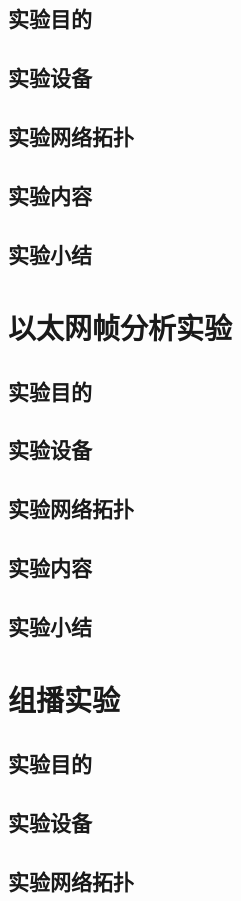 \documentclass[lang=cn,11pt,a4paper,cite=authoryear]{elegantpaper}
\begin{document}
\subsection{实验目的}
\subsection{实验设备}
\subsection{实验网络拓扑}
\subsection{实验内容}
\subsection{实验小结}
\section{以太网帧分析实验}
\subsection{实验目的}
\subsection{实验设备}
\subsection{实验网络拓扑}
\subsection{实验内容}
\subsection{实验小结}
\section{组播实验}
\subsection{实验目的}
\subsection{实验设备}
\subsection{实验网络拓扑}
\end{document}
